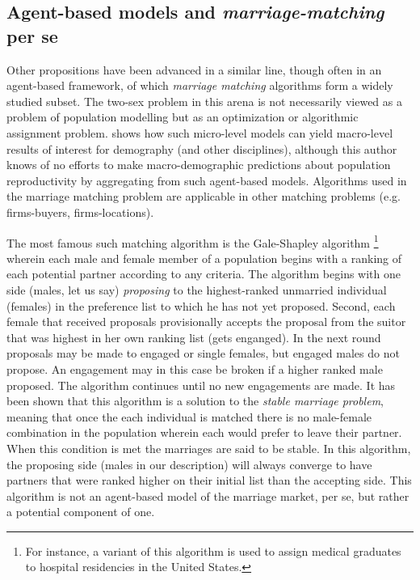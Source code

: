 \subsection{Agent-based models and \textit{marriage-matching} per se} 
Other
propositions have been advanced in a similar line\citep{jacquemet2011marriage, Dagsvik1998report},
though often in an agent-based framework, of which \textit{marriage matching}
 algorithms form a widely studied subset. The two-sex problem in this
arena is not necessarily viewed as a problem of population modelling but as an
optimization or algorithmic assignment problem. \citet{dagsvik2000aggregation}
shows how such micro-level models can yield macro-level results of interest for
demography (and other disciplines), although this author knows of no efforts to
make macro-demographic predictions about population reproductivity by
aggregating from such agent-based models. Algorithms used in 
the marriage matching problem are applicable in other matching problems (e.g.
firms-buyers, firms-locations). 

The most famous such matching algorithm is
the Gale-Shapley algorithm \citep{gale1962college}\footnote{For instance, a variant of this algorithm is used 
to assign medical graduates to hospital residencies in the United States.}
wherein each male and female member of a population begins with a ranking of
each potential partner according to any criteria. The algorithm begins with one
side (males, let us say) \textit{proposing} to the
highest-ranked unmarried individual (females) in the preference list to which
he has not yet proposed. Second, each female that received proposals
provisionally accepts the proposal from the suitor that was highest in her own
ranking list (gets enganged). In the next round proposals may be made to engaged
or single females, but engaged males do not propose. An engagement may in this
case be broken if a higher ranked male proposed. The algorithm continues until
no new engagements are made. It has been shown that this algorithm is a solution
to the \textit{stable marriage problem}, meaning that once the each individual
is matched there is no male-female combination in the population wherein each
would prefer to leave their partner. When this condition is met the marriages
are said to be stable. In this algorithm, the proposing side (males in our
description) will always converge to have partners that were ranked higher on
their initial list than the accepting side. This algorithm is not an agent-based
model of the marriage market, per se, but rather a potential component of one.

